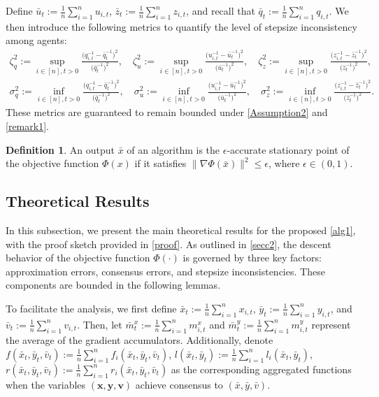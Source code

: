 \documentclass{article}
\theoremstyle{plain}
\theoremstyle{definition}
\newtheorem{definition}[definition]{Definition}
\theoremstyle{remark}
\begin{document}
Define \( \bar{u}_t \!\!:=\!\! \frac{1}{n} \sum_{i=1}^n u_{i,t} \), \( \bar{z}_t \!\!:=\!\! \frac{1}{n} \sum_{i=1}^n z_{i,t} \), and recall that \(\bar{q}_t \!\!:=\!\! \frac{1}{n} \sum_{i=1}^n q_{i,t}\). We then introduce the following metrics to quantify the level of stepsize inconsistency among agents: 
\begin{align}
\zeta_q^2 := \sup_{i \in [n], t > 0} 
\frac{\big(q_{i,t}^{-1} - \bar{q}_t^{-1}\big)^2}{\big(\bar{q}_t^{-1}\big)^2},\quad
\zeta_u^2 := \sup_{i \in [n], t > 0} 
\frac{\big(u_{i,t}^{-1} - \bar{u}_t^{-1}\big)^2}{\big(\bar{u}_t^{-1}\big)^2},\quad
\zeta_z^2 := \sup_{i \in [n], t > 0} 
\frac{\big(z_{i,t}^{-1} - \bar{z}_t^{-1}\big)^2}{\big(\bar{z}_t^{-1}\big)^2},\nonumber
\end{align}
\vspace{-0.3cm}
\begin{align*}
\sigma_q^2 := \inf_{i \in [n], t > 0} 
\frac{\big(q_{i,t}^{-1} - \bar{q}_t^{-1}\big)^2}{\big(\bar{q}_t^{-1}\big)^2},\quad
\sigma_u^2 := \inf_{i \in [n], t > 0} 
\frac{\big(u_{i,t}^{-1} - \bar{u}_t^{-1}\big)^2}{\big(\bar{u}_t^{-1}\big)^2},\quad
\sigma_z^2 := \inf_{i \in [n], t > 0} 
\frac{\big(z_{i,t}^{-1} - \bar{z}_t^{-1}\big)^2}{\big(\bar{z}_t^{-1}\big)^2}.
\end{align*}
These metrics are guaranteed to remain bounded under \cref{Assumption2} and \cref{remark1}. 
\begin{definition}
An output \(\bar{x}\) of an algorithm is the \(\epsilon\)-accurate stationary point of the objective function \(\Phi(x)\) if it satisfies \(\|\nabla \Phi(\bar{x})\|^2 \leq \epsilon\), where \(\epsilon \in (0, 1)\).
\end{definition}

\subsection{Theoretical Results}\label{sec3.3}

In this subsection, we present the main theoretical results for the proposed \cref{alg1}, with the proof sketch provided in \cref{proof}. As outlined in \cref{secc2}, the descent behavior of the objective function \(\Phi(\cdot)\) is governed by three key factors: approximation errors, consensus errors, and stepsize inconsistencies. These components are bounded in the following lemmas.

To facilitate the analysis, we first define \(\bar{x}_t := \frac{1}{n} \sum_{i=1}^n x_{i,t}\), \(\bar{y}_t := \frac{1}{n} \sum_{i=1}^n y_{i,t}\), and \(\bar{v}_t := \frac{1}{n} \sum_{i=1}^n v_{i,t}\). Then, let \(\bar{m}^x_t := \frac{1}{n} \sum_{i=1}^n m^x_{i,t}\) and \(\bar{m}^y_t := \frac{1}{n} \sum_{i=1}^n m^y_{i,t}\) represent the average of the gradient accumulators. Additionally, denote $f(\bar{x}_t,\bar{y}_t,\bar{v}_t)\!:=\!\frac{1}{n}\sum_{i=1}^n f_i(\bar{x}_t,\bar{y}_t,\bar{v}_t)$,
$l(\bar{x}_t, \bar{y}_t)\!:=\! \frac{1}{n}\sum_{i=1}^nl_i(\bar{x}_t, \bar{y}_t)$, 
$r(\bar{x}_t, \bar{y}_t, \bar{v}_t)\!:=\! \frac{1}{n}\sum_{i=1}^nr_i(\bar{x}_t, \bar{y}_t, \bar{v}_t)$ as the corresponding aggregated functions when the variables $(\mathbf{x},\mathbf{y},\mathbf{v})$ achieve consensus to $(\bar{x},\bar{y},\bar{v})$.
\end{document}
